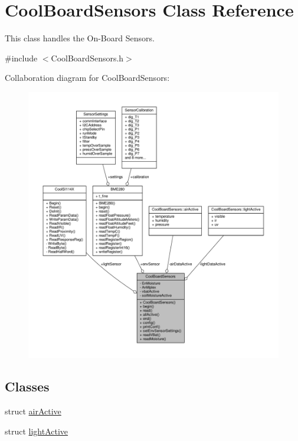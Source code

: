 \hypertarget{class_cool_board_sensors}{}\section{Cool\+Board\+Sensors Class Reference}
\label{class_cool_board_sensors}


This class handles the On-\/\+Board Sensors.  




{\ttfamily \#include $<$Cool\+Board\+Sensors.\+h$>$}



Collaboration diagram for Cool\+Board\+Sensors\+:
\nopagebreak
\begin{figure}[H]
\begin{center}
\leavevmode
\includegraphics[width=350pt]{df/db9/class_cool_board_sensors__coll__graph}
\end{center}
\end{figure}
\subsection*{Classes}
\begin{DoxyCompactItemize}
\item 
struct \hyperlink{class_cool_board_sensors_d7/db6/struct_cool_board_sensors_1_1air_active}{air\+Active}
\item 
struct \hyperlink{class_cool_board_sensors_df/da3/struct_cool_board_sensors_1_1light_active}{light\+Active}
\end{DoxyCompactItemize}
